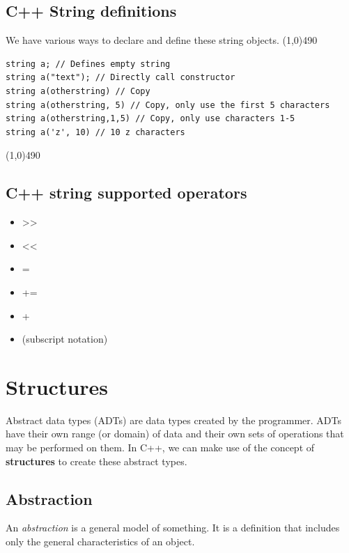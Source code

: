 \documentclass{report}
\begin{document}
    \bigbreak \noindent 
    \subsection{C++ String definitions}
    \bigbreak \noindent 
    We have various ways to declare and define these string objects.
    \bigbreak \noindent 
    \line(1,0){490}
    \begin{verbatim}
string a; // Defines empty string
string a("text"); // Directly call constructor
string a(otherstring) // Copy
string a(otherstring, 5) // Copy, only use the first 5 characters
string a(otherstring,1,5) // Copy, only use characters 1-5
string a('z', 10) // 10 z characters
    \end{verbatim}
    \line(1,0){490}

    \bigbreak \noindent 
    \subsection{C++ string supported operators}
    \bigbreak \noindent 
    \begin{itemize}
        \item >>
        \item <<
        \item =
        \item +=
        \item +
        \item [] (subscript notation)
    \end{itemize}

    \pagebreak \bigbreak \noindent 
    \section{\LARGE Structures}
    \bigbreak \noindent 
    \begin{concept}
        Abstract data types (ADTs) are data types created by the programmer. ADTs have their own range (or domain) of data and their own sets of operations that may be performed on them. In C++, we can make use of the concept of \textbf{structures} to create these abstract types. 
	\end{concept}

	\bigbreak \noindent 
	\subsection{Abstraction}
	\bigbreak \noindent 
	An \textit{abstraction} is a general model  of something. It is a definition that includes only the general characteristics of an object.
\end{document}
